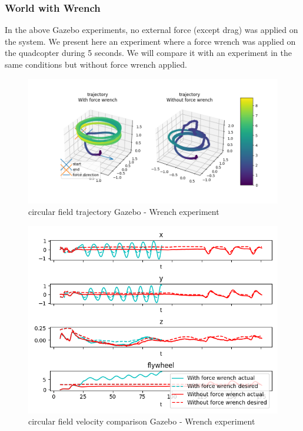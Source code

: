 \subsubsection{World with Wrench}
In the above Gazebo experiments, no external force (except drag) was applied on the system. 
We present here an experiment where a force wrench was applied on the quadcopter during 5 seconds. 
We will compare it with an experiment in the same conditions but without force wrench applied.
\begin{figure}[h!]
   \centering
   \includegraphics[width=\linewidth]{Images/gazebo_trajectory_wrench_circular.png}
   \caption{circular field trajectory Gazebo - Wrench experiment}
   \label{fig:trajgazebocircularfwrench}
\end{figure}
\begin{figure}[h!]
   \centering
   \includegraphics[width=\linewidth]{Images/gazebo_circular_wrench_V.png}
   \caption{circular field velocity comparison Gazebo - Wrench experiment}
   \label{fig:velgazebocircularfwrench}
\end{figure}
